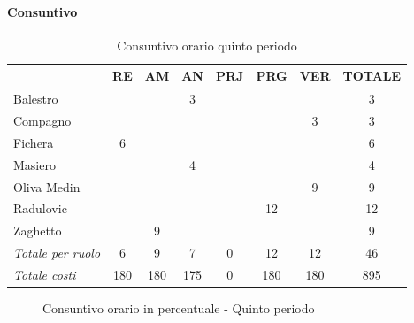 \documentclass[a4paper,12pt]{article}
\begin{document}
            \paragraph{Consuntivo}
                \begin{table}[H]
                \centering
                \begin{tabular}{|l|c|c|c|c|c|c|c|}
                \hline
                    \rowcolor{lightgray}{\textbf{Membro}} & {\textbf{RE}} & {\textbf{AM}} & {\textbf{AN}} & {\textbf{PRJ}} & {\textbf{PRG}} & {\textbf{VER}} & {\textbf{TOTALE}}\\
                \hline
                    Balestro & & & 3 & & & & 3\\
                \hline
                    Compagno & & & & & & 3 & 3\\
                \hline
                    Fichera & 6 & & & & & & 6\\
                \hline
                    Masiero & & & 4 & & & & 4\\
                \hline
                    Oliva Medin & & & & & & 9 & 9\\
                \hline
                    Radulovic & & & & & 12 & & 12\\
                \hline
                    Zaghetto & & 9 & & & & & 9\\
                \hline
                    \rowcolor{lightgray}\textit{Totale per ruolo} & 6 & 9 & 7 & 0 & 12 & 12 & 46\\
                \hline
                    \rowcolor{lightgray}\textit{Totale costi} & 180 & 180 & 175 & 0 & 180 & 180 & 895\\
                \hline
                \end{tabular}
                \caption{Consuntivo orario quinto periodo}
                \end{table}

                \begin{figure}[H]
                \centering
                \caption{Consuntivo orario in percentuale - Quinto periodo}
                \end{figure}
                
\end{document}
